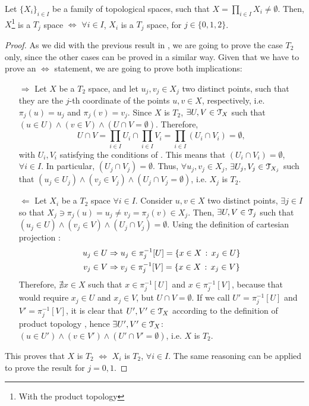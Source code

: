 \begin{theorem}
	\label{th:product-topology-separation-consistency}
	Let $\{X_i\}_{i\in I}$ be a family of topological spaces, such that \textbf{$X=\prod_{i\in I}X_i\neq \emptyset$}.
	Then, $X$\footnote{With the product topology} is a $T_j$ space $\iff$ $\forall i\in I$, $X_i$ is a $T_j$ space, for $j\in\{0,1,2\}$.
\end{theorem}
\begin{proof}
	As we did with the previous result in , we are going to prove the case $T_2$ only, since the other cases can be proved in a similar way.
	Given that we have to prove an $\iff$ statement, we are going to prove both implications:
	\begin{itemize}
	\item[$\boxed{\Rightarrow}$] Let $X$ be a $T_2$ space, and let $u_j, v_j \in X_j$ two distinct points, such that they are the $j$-th coordinate of the points $u,v\in X$, respectively, i.e. $\pi_j(u)=u_j$ and $\pi_j(v)=v_j$. Since $X$ is $T_2$, $\exists U, V\in \EuScript{T}_X$ such that $(u\in U)\land (v\in V)\land (U\cap V=\emptyset)$. Therefore,
	$$
	U\cap V= \prod_{i\in I}U_i\cap\prod_{i\in I}V_i=\prod_{i\in I}(U_i\cap V_i)=\emptyset,
	$$
	with $U_i, V_i$ satisfying the conditions of .
	This means that $(U_i\cap V_i)=\emptyset$, $\forall i\in I$. In particular, $(U_j\cap V_j)=\emptyset$.
	Thus, $\forall u_j, v_j\in X_j$, $\exists U_j, V_j \in \EuScript{T}_{X_j}$ such that $(u_j\in U_j)\land (v_j\in V_j)\land (U_j\cap V_j=\emptyset)$, i.e. $X_j$ is $T_2$.
	\item[$\boxed{\Leftarrow}$] Let $X_i$ be a $T_2$ space $\forall i\in I$. Consider $u,v\in X$ two distinct points, $\exists j\in I$ so that $X_j\ni \pi_j(u) = u_j \neq v_j=\pi_j(v)\in X_j$. Then, $\exists U,V \in \EuScript{T}_j$ such that $(u_j\in U)\land (v_j\in V)\land (U_j\cap V_j)=\emptyset$.
	Using the definition of cartesian projection :
	\begin{align*}
		u_j\in U &\Rightarrow u_j\in\pi^{-1}_j[U]=\left\{x\in X\,:\,x_j\in U\right\}\\
		v_j\in V &\Rightarrow v_j\in\pi^{-1}_j[V]=\left\{x\in X\,:\,x_j\in V\right\}
	\end{align*}
	Therefore, $\nexists x\in X$ such that $x\in \pi^{-1}_j[U]$ and $x\in \pi^{-1}_j[V]$,
	because that would require $x_j\in U$ and $x_j\in V$, but $U\cap V=\emptyset$.
	If we call $U'=\pi^{-1}_j[U]$ and $V'=\pi^{-1}_j[V]$, it is clear that $U', V'\in \EuScript{T}_X$ according to the definition of product topology , hence $\exists U', V' \in \EuScript{T}_X$: $(u\in U')\land (v\in V')\land (U'\cap V'=\emptyset)$, i.e. $X$ is $T_2$.
	\end{itemize}
	This proves that $X$ is $T_2$ $\iff$ $X_i$ is $T_2$, $\forall i\in I$. The same reasoning can be applied to prove the result for $j=0,1$.
\end{proof}

